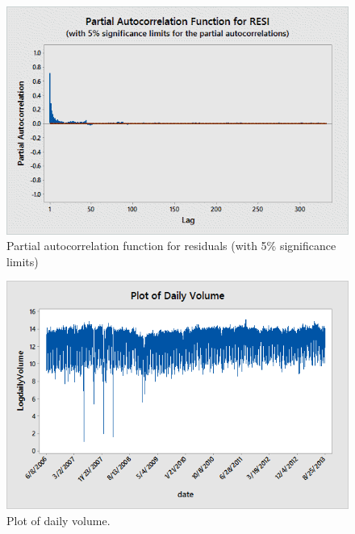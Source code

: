         \begin{figure}[!ht]
        \centering
        \includegraphics[width=\textwidth]{chapters/chapter_stat_ts/figures/resi.png}
        \caption{Partial autocorrelation function for residuals (with 5\% significance limits) \label{fig:partresi}}
        \end{figure}
        
        \begin{figure}[!ht]
        \centering
        \includegraphics[width=\textwidth]{chapters/chapter_stat_ts/figures/dailyvol.png}
        \caption{Plot of daily volume. \label{fig:dailyvol}}
        \end{figure}


